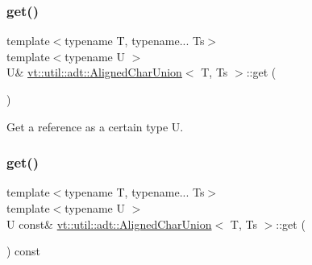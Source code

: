 \mbox{\label{structvt_1_1util_1_1adt_1_1_aligned_char_union_acd5ebe14c0990b3edacf9aeea031499f}} 
\subsubsection{\texorpdfstring{get()}{get()}\hspace{0.1cm}{\footnotesize\ttfamily [1/2]}}
{\footnotesize\ttfamily template$<$typename T, typename... Ts$>$ \\
template$<$typename U $>$ \\
U\& \hyperlink{structvt_1_1util_1_1adt_1_1_aligned_char_union}{vt\+::util\+::adt\+::\+Aligned\+Char\+Union}$<$ T, Ts $>$\+::get (\begin{DoxyParamCaption}{ }\end{DoxyParamCaption})\hspace{0.3cm}{\ttfamily [inline]}}



Get a reference as a certain type {\ttfamily U}. 

\mbox{\label{structvt_1_1util_1_1adt_1_1_aligned_char_union_a4dfd0f51d2c58aa8af33e50e82fe98fa}} 
\subsubsection{\texorpdfstring{get()}{get()}\hspace{0.1cm}{\footnotesize\ttfamily [2/2]}}
{\footnotesize\ttfamily template$<$typename T, typename... Ts$>$ \\
template$<$typename U $>$ \\
U const\& \hyperlink{structvt_1_1util_1_1adt_1_1_aligned_char_union}{vt\+::util\+::adt\+::\+Aligned\+Char\+Union}$<$ T, Ts $>$\+::get (\begin{DoxyParamCaption}{ }\end{DoxyParamCaption}) const\hspace{0.3cm}{\ttfamily [inline]}}



